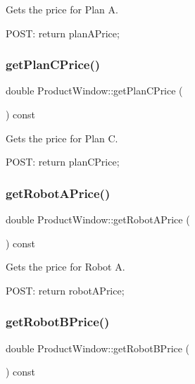 Gets the price for Plan A. 

P\+O\+ST\+: return plan\+A\+Price; \mbox{\label{class_product_window_a6236c105e5feffeb6bc778ea7f936939}} 
\subsubsection{\texorpdfstring{get\+Plan\+C\+Price()}{getPlanCPrice()}}
{\footnotesize\ttfamily double Product\+Window\+::get\+Plan\+C\+Price (\begin{DoxyParamCaption}{ }\end{DoxyParamCaption}) const}



Gets the price for Plan C. 

P\+O\+ST\+: return plan\+C\+Price; \mbox{\label{class_product_window_a2256cbdf9844bb57ac003fcb719cabbb}} 
\subsubsection{\texorpdfstring{get\+Robot\+A\+Price()}{getRobotAPrice()}}
{\footnotesize\ttfamily double Product\+Window\+::get\+Robot\+A\+Price (\begin{DoxyParamCaption}{ }\end{DoxyParamCaption}) const}



Gets the price for Robot A. 

P\+O\+ST\+: return robot\+A\+Price; \mbox{\label{class_product_window_a4017b51e048ec4e725af49dc0dfb5c2b}} 
\subsubsection{\texorpdfstring{get\+Robot\+B\+Price()}{getRobotBPrice()}}
{\footnotesize\ttfamily double Product\+Window\+::get\+Robot\+B\+Price (\begin{DoxyParamCaption}{ }\end{DoxyParamCaption}) const}



